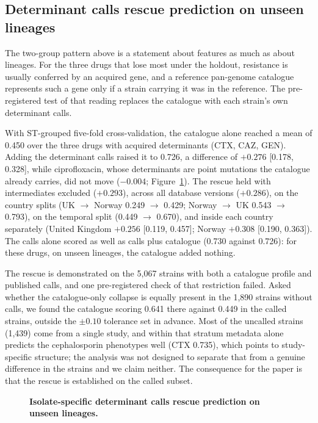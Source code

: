 \subsection*{Determinant calls rescue prediction on unseen lineages}

The two-group pattern above is a statement about features as much as about lineages. For the three
drugs that lose most under the holdout, resistance is usually conferred by an acquired gene, and a
reference pan-genome catalogue represents such a gene only if a strain carrying it was in the
reference. The pre-registered test of that reading replaces the catalogue with each strain's own
determinant calls.

With ST-grouped five-fold cross-validation, the catalogue alone reached a mean \nap{} of 0.450 over
the three drugs with acquired determinants (CTX, CAZ, GEN). Adding the determinant calls raised it
to 0.726, a difference of $+0.276$ [0.178, 0.328], while ciprofloxacin, whose determinants are
point mutations the catalogue already carries, did not move ($-0.004$; Figure~\ref{fig:rescue}).
The rescue held with intermediates excluded ($+0.293$), across all database versions ($+0.286$), on
the country splits (UK $\rightarrow$ Norway 0.249 $\rightarrow$ 0.429; Norway $\rightarrow$ UK
0.543 $\rightarrow$ 0.793), on the temporal split (0.449 $\rightarrow$ 0.670), and inside each
country separately (United Kingdom $+0.256$ [0.119, 0.457]; Norway $+0.308$ [0.190, 0.363]). The
calls alone scored as well as calls plus catalogue (0.730 against 0.726): for these drugs, on
unseen lineages, the catalogue added nothing.

The rescue is demonstrated on the 5,067 strains with both a catalogue profile and published calls,
and one pre-registered check of that restriction failed. Asked whether the catalogue-only collapse
is equally present in the 1,890 strains without calls, we found the catalogue scoring 0.641 there
against 0.449 in the called strains, outside the $\pm0.10$ tolerance set in advance. Most of the
uncalled strains (1,439) come from a single study, and within that stratum metadata alone predicts
the cephalosporin phenotypes well (CTX \nap{} 0.735), which points to study-specific structure; the
analysis was not designed to separate that from a genuine difference in the strains and we claim
neither. The consequence for the paper is that the rescue is established on the called subset.

\begin{figure}[t]\centering
{}
\caption{\textbf{Isolate-specific determinant calls rescue prediction on unseen lineages.}
}\label{fig:rescue}
\end{figure}

